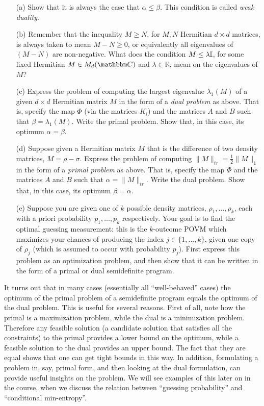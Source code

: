 \documentclass[12pt]{article}
\begin{document}
\begin{enumerate}
\begin{enumerate}
\item[(a)] Show that it is always the case that $\alpha \leq \beta$. This condition is called \emph{weak duality}.
\item[(b)] Remember that the inequality $M\geq N$, for $M,N$ Hermitian $d\times d$ matrices, is always taken to mean $M-N\geq 0$, or equivalently all eigenvalues of $(M-N)$ are non-negative. What does the condition $M \leq \lambda \mathbb{I}$, for some fixed Hermitian $M\in M_d(\C)$ and $\lambda\in \mathbb{R}$, mean on the eigenvalues of $M$? 
\item[(c)] Express the problem of computing the largest eigenvalue $\lambda_1(M)$ of a given $d\times d$ Hermitian matrix $M$ in the form of a \emph{dual problem} as above. That is, specify the map $\Phi$ (via the matrices $K_i$) and the matrices $A$ and $B$ such that $\beta = \lambda_1(M)$. Write the primal problem. Show that, in this case, its optimum $\alpha = \beta$. 
\item[(d)] Suppose given a Hermitian matrix $M$ that is the difference of two density matrices, $M=\rho-\sigma$. Express the problem of computing $\|M\|_{tr} = \frac{1}{2}\|M\|_1$ in the form of a \emph{primal problem} as above. That is, specify the map $\Phi$ and the matrices $A$ and $B$ such that $\alpha = \|M\|_{tr}$. Write the dual problem. Show that, in this case, its optimum $\beta = \alpha$. 
\item[(e)] Suppose you are given one of $k$ possible density matrices, $\rho_1,\ldots,\rho_k$, each with a priori probability $p_1,\ldots,p_k$ respectively. Your goal is to find the optimal guessing measurement: this is the $k$-outcome POVM which maximizes your chances of producing the index $j\in\{1,\ldots,k\}$, given one copy of $\rho_j$ (which is assumed to occur with probability $p_j$). First express this problem as an optimization problem, and then show that it can be written in the form of a primal or dual semidefinite program.
\end{enumerate}
It turns out that in many cases (essentially all ``well-behaved'' cases) the optimum of the primal problem of a semidefinite program equals the optimum of the dual problem. This is useful for several reasons. First of all, note how the primal is a maximization problem, while the dual is a minimization problem. Therefore any feasible solution (a candidate solution that satisfies all the constraints) to the primal provides a lower bound on the optimum, while a feasible solution to the dual provides an upper bound. The fact that they are equal shows that one can get tight bounds in this way. In addition, formulating a problem in, say, primal form, and then looking at the dual formulation, can provide useful insights on the problem. We will see examples of this later on in the course, when we discuss the relation between ``guessing probability'' and ``conditional min-entropy''. 

\end{enumerate}
\end{document}
